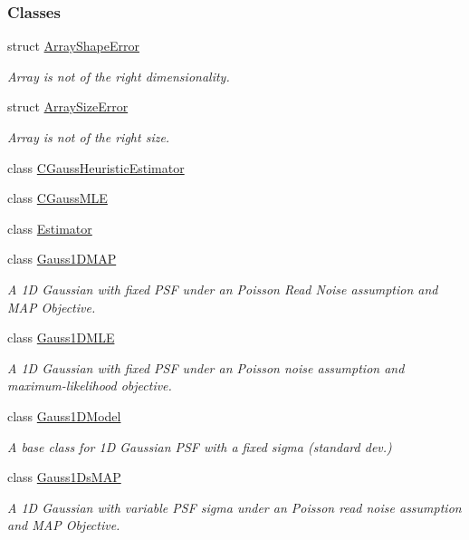 \subsubsection*{Classes}
\begin{DoxyCompactItemize}
\item 
struct \hyperlink{structmappel_1_1ArrayShapeError}{Array\+Shape\+Error}
\begin{DoxyCompactList}\small\item\em Array is not of the right dimensionality. \end{DoxyCompactList}\item 
struct \hyperlink{structmappel_1_1ArraySizeError}{Array\+Size\+Error}
\begin{DoxyCompactList}\small\item\em Array is not of the right size. \end{DoxyCompactList}\item 
class \hyperlink{classmappel_1_1CGaussHeuristicEstimator}{C\+Gauss\+Heuristic\+Estimator}
\item 
class \hyperlink{classmappel_1_1CGaussMLE}{C\+Gauss\+M\+LE}
\item 
class \hyperlink{classmappel_1_1Estimator}{Estimator}
\item 
class \hyperlink{classmappel_1_1Gauss1DMAP}{Gauss1\+D\+M\+AP}
\begin{DoxyCompactList}\small\item\em A 1D Gaussian with fixed P\+SF under an Poisson Read Noise assumption and M\+AP Objective. \end{DoxyCompactList}\item 
class \hyperlink{classmappel_1_1Gauss1DMLE}{Gauss1\+D\+M\+LE}
\begin{DoxyCompactList}\small\item\em A 1D Gaussian with fixed P\+SF under an Poisson noise assumption and maximum-\/likelihood objective. \end{DoxyCompactList}\item 
class \hyperlink{classmappel_1_1Gauss1DModel}{Gauss1\+D\+Model}
\begin{DoxyCompactList}\small\item\em A base class for 1D Gaussian P\+SF with a fixed sigma (standard dev.) \end{DoxyCompactList}\item 
class \hyperlink{classmappel_1_1Gauss1DsMAP}{Gauss1\+Ds\+M\+AP}
\begin{DoxyCompactList}\small\item\em A 1D Gaussian with variable P\+SF sigma under an Poisson read noise assumption and M\+AP Objective. \end{DoxyCompactList}\item 

\end{DoxyCompactItemize}
